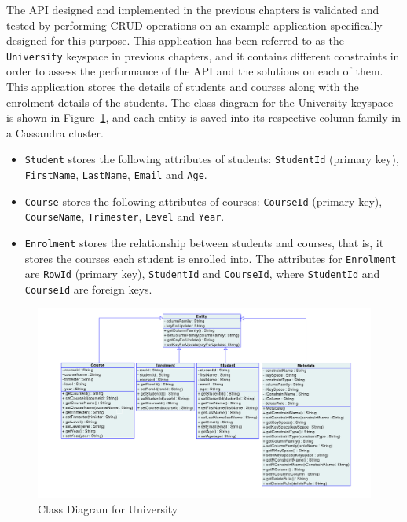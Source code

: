The  \ac{API} designed and implemented in the previous chapters is validated and
tested by performing \ac{CRUD} operations on an example application
specifically designed for this purpose.  This application has been referred to
as the \texttt{University} keyspace in previous chapters,  and it contains
different constraints in order to  assess the performance of the \ac{API} and
the solutions on each of them.  This application stores the details of students and
 courses along with the enrolment details of the students.  The class diagram for
 the University keyspace is shown in Figure~\ref{fexp:ClassDiagram},  and each
 entity is saved into its respective column family in a Cassandra cluster. 

	\begin{itemize}
	  \item \texttt{Student} stores the  following attributes of students:
	   \texttt{StudentId} (primary key),  \texttt{FirstName},  \texttt{LastName}, 
	  \texttt{Email} and \texttt{Age}. 
	  \item \texttt{Course} stores  the following  attributes of courses:
	  \texttt{CourseId} (primary key),  \texttt{CourseName},  \texttt{Trimester}, 
	  \texttt{Level} and \texttt{Year}. 
	  \item \texttt{Enrolment} stores the  relationship between
	  students and courses,  that is,  it stores the courses each student is enrolled
	  into.   The attributes for \texttt{Enrolment} are \texttt{RowId} (primary
	  key),  \texttt{StudentId} and \texttt{CourseId},  where \texttt{StudentId}
	  and \texttt{CourseId} are foreign keys. 
	\end{itemize}
	
	\begin{figure}[h] \centering
		\includegraphics[width=1\textwidth]{./figure/Solutions/classdiagram-experimental.png}
		\caption{Class Diagram for University}\label{fexp:ClassDiagram}
	\end{figure} 

